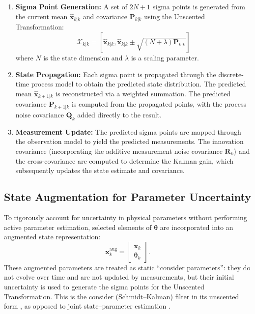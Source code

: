 \documentclass[conference]{IEEEtran}
\begin{document}
\begin{enumerate}
    \item \textbf{Sigma Point Generation:} A set of $2N+1$ sigma points is generated from the current mean $\hat{\bm x}_{k|k}$ and covariance $\bm P_{k|k}$ using the Unscented Transformation:
    \begin{equation}
        \mathcal{X}_{k|k} = \left[ \hat{\bm x}_{k|k}, \hat{\bm x}_{k|k} \pm \sqrt{(N + \lambda)\bm P_{k|k}} \right]
    \end{equation}
    where $N$ is the state dimension and $\lambda$ is a scaling parameter.
    \item \textbf{State Propagation:} Each sigma point is propagated through the discrete-time process model to obtain the predicted state distribution. The predicted mean $\hat{\bm x}_{k+1|k}$ is reconstructed via a weighted summation. The predicted covariance $\bm P_{k+1|k}$ is computed from the propagated points, with the process noise covariance $\bm Q_k$ added directly to the result.
    \item \textbf{Measurement Update:} The predicted sigma points are mapped through the observation model to yield the predicted measurements. The innovation covariance (incorporating the additive measurement noise covariance $\bm R_k$) and the cross-covariance are computed to determine the Kalman gain, which subsequently updates the state estimate and covariance.
\end{enumerate}

\subsection{State Augmentation for Parameter Uncertainty}
To rigorously account for uncertainty in physical parameters without performing active parameter estimation, selected elements of $\bm\theta$ are incorporated into an augmented state representation:
\begin{equation}
    \bm x_k^{\mathrm{aug}} = \begin{bmatrix}
        \bm x_k \\
        \bm\theta_k
    \end{bmatrix}.
\end{equation}
These augmented parameters are treated as static ``consider parameters'': they do not evolve over time and are not updated by measurements, but their initial uncertainty is used to generate the sigma points for the Unscented Transformation. This is the consider (Schmidt--Kalman) filter \cite{mc_gee_application_1962, woodbury_consider_2010} in its unscented form \cite{stauch_unscented_2015}, as opposed to joint state--parameter estimation \cite{wan_unscented_2000}.
\end{document}
